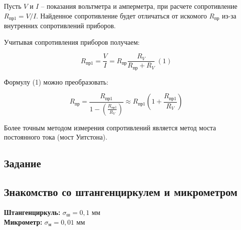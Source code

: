 \documentclass[a4paper, 12pt]{article}
\begin{document}
	Пусть $V$ и $I$ -- показания вольтметра и амперметра, при расчете сопротивление $R_\text{пр1} = V/I$. Найденное сопротивление будет отличаться от искомого $R_\text{пр}$ из-за внутренних сопротивлений приборов.
	
	\begin{center}{Учитывая сопротивления приборов получаем:}
	\end{center}
    \begin{center}
	\begin{minipage}{0.45\textwidth}
		\centering
		\begin{equation}\label{r1}
			R_\text{пр1} = \frac{V}{I} = R_\text{пр}\frac{R_V} {R_\text{пр} + R_V} \: (1)
		\end{equation}
	\end{minipage}
    \end{center}

	
	\begin{center}
		Формулу (1) можно преобразовать:
	
		\begin{minipage}{0.45\textwidth}
			\centering
			\begin{equation}\label{r3}
				R_\text{пр} = \frac{R_\text{пр1}}{1 - \left(\frac{R_\text{пр1}}{R_V} \right)} \approx R_\text{пр1}\left(1 + \frac{R_\text{пр1}}{R_V} \right)
			\end{equation}
		\end{minipage}

	\end{center}
		
	
	
	Более точным методом измерения сопротивлений является метод моста постоянного тока (мост Уитстона).
\begin{center}
\section*{Задание}  
\end{center}

        \begin{center}
	\subsection*{Знакомство со штангенциркулем и микрометром}
	\end{center}
 
	\textbf{Штангенциркуль:} $ \sigma_\text{ш} = 0,1 \text{ мм}$\\
	\textbf{Микрометр:} $ \sigma_\text{м} = 0,01 \text{ мм}$
	
\end{document}
